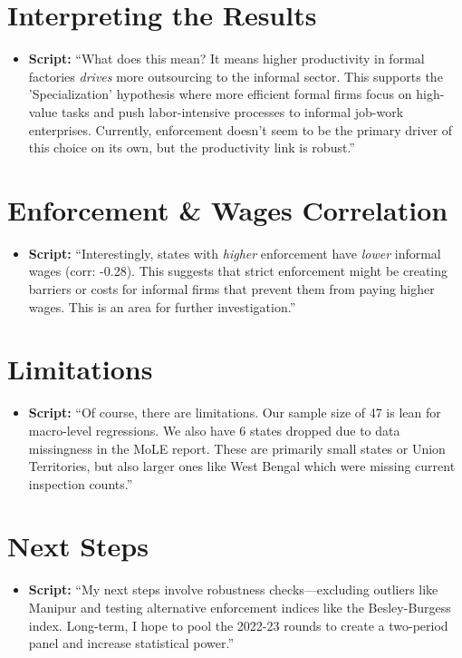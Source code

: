 \documentclass[11pt]{article}
\begin{document}
\section{Interpreting the Results}
\begin{itemize}
    \item \textbf{Script:} ``What does this mean? It means higher productivity in formal factories \textit{drives} more outsourcing to the informal sector. This supports the 'Specialization' hypothesis where more efficient formal firms focus on high-value tasks and push labor-intensive processes to informal job-work enterprises. Currently, enforcement doesn't seem to be the primary driver of this choice on its own, but the productivity link is robust.''
\end{itemize}

\section{Enforcement \& Wages Correlation}
\begin{itemize}
    \item \textbf{Script:} ``Interestingly, states with \textit{higher} enforcement have \textit{lower} informal wages (corr: -0.28). This suggests that strict enforcement might be creating barriers or costs for informal firms that prevent them from paying higher wages. This is an area for further investigation.''
\end{itemize}

\section{Limitations}
\begin{itemize}
    \item \textbf{Script:} ``Of course, there are limitations. Our sample size of 47 is lean for macro-level regressions. We also have 6 states dropped due to data missingness in the MoLE report. These are primarily small states or Union Territories, but also larger ones like West Bengal which were missing current inspection counts.''
\end{itemize}

\section{Next Steps}
\begin{itemize}
    \item \textbf{Script:} ``My next steps involve robustness checks—excluding outliers like Manipur and testing alternative enforcement indices like the Besley-Burgess index. Long-term, I hope to pool the 2022-23 rounds to create a two-period panel and increase statistical power.''
\end{itemize}
\end{document}
